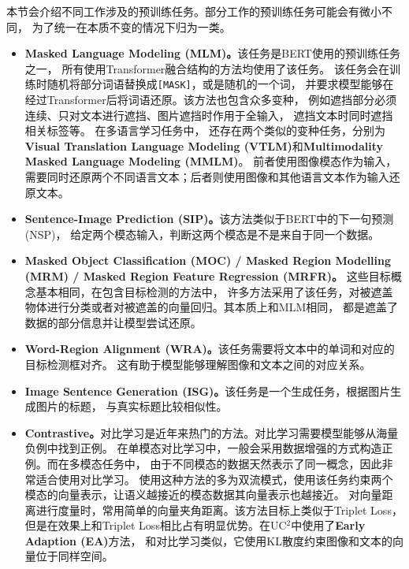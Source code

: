 本节会介绍不同工作涉及的预训练任务。部分工作的预训练任务可能会有微小不同，
为了统一在本质不变的情况下归为一类。
\begin{itemize}
    \item \textbf{Masked Language Modeling (MLM)。}该任务是BERT使用的预训练任务之一，
    所有使用Transformer融合结构的方法均使用了该任务。
    该任务会在训练时随机将部分词语替换成\verb|[MASK]|，或是随机的一个词，
    并要求模型能够在经过Transformer后将词语还原。该方法也包含众多变种，
    例如遮挡部分必须连续\cite{m6}、只对文本进行遮挡\cite{visualbert}、图片遮挡时作用于全输入\cite{vlbert}，
    遮挡文本时同时遮挡相关标签\cite{oscar}等。
    在多语言学习任务中，
    还存在两个类似的变种任务，分别为\textbf{Visual Translation Language Modeling (VTLM)}和\textbf{Multimodality Masked Language Modeling (MMLM)}。
    前者使用图像模态作为输入，需要同时还原两个不同语言文本；后者则使用图像和其他语言文本作为输入还原文本。
    
    \item \textbf{Sentence-Image Prediction (SIP)。}该方法类似于BERT中的下一句预测(NSP)，
    给定两个模态输入，判断这两个模态是不是来自于同一个数据。
    
    \item \textbf{Masked Object Classification (MOC) / Masked Region Modelling (MRM) / Masked Region Feature Regression (MRFR)。}
    这些目标概念基本相同，在包含目标检测的方法中，
    许多方法采用了该任务，对被遮盖物体进行分类或者对被遮盖的向量回归。其本质上和MLM相同，
    都是遮盖了数据的部分信息并让模型尝试还原。
    
    \item \textbf{Word-Region Alignment (WRA)。}该任务需要将文本中的单词和对应的目标检测框对齐。
    这有助于模型能够理解图像和文本之间的对应关系。
    
    \item \textbf{Image Sentence Generation (ISG)。}该任务是一个生成任务，根据图片生成图片的标题，
    与真实标题比较相似性。
    
    \item \textbf{Contrastive。}对比学习是近年来热门的方法。对比学习需要模型能够从海量负例中找到正例。
    在单模态对比学习中，一般会采用数据增强的方式构造正例。而在多模态任务中，
    由于不同模态的数据天然表示了同一概念，因此非常适合使用对比学习。
    使用这种方法的多为双流模式，使用该任务约束两个模态的向量表示，让语义越接近的模态数据其向量表示也越接近。
    对向量距离进行度量时，常用简单的向量夹角距离。该方法目标上类似于Triplet Loss，
    但是在效果上和Triplet Loss相比占有明显优势。在UC$^2$中使用了\textbf{Early Adaption (EA)}方法，
    和对比学习类似，它使用KL散度约束图像和文本的向量位于同样空间。
\end{itemize}

